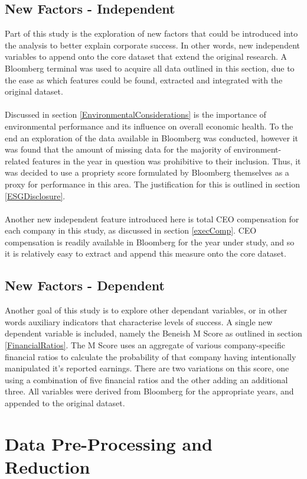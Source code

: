\subsection{New Factors - Independent}
{Part of this study is the exploration of new factors that could be introduced into the analysis to better explain corporate success. In other words, new independent variables to append onto the core dataset that extend the original research. A Bloomberg terminal was used to acquire all data outlined in this section, due to the ease as which features could be found, extracted and integrated with the original dataset.}\\\\
{Discussed in section \ref{EnvironmentalConsiderations} is the importance of environmental performance and its influence on overall economic health. To the end an exploration of the data available in Bloomberg was conducted, however it was found that the amount of missing data for the majority of environment-related features in the year in question was prohibitive to their inclusion. Thus, it was decided to use a propriety score formulated by Bloomberg themselves as a proxy for performance in this area. The justification for this is outlined in section \ref{ESGDisclosure}.}\\\\
{Another new independent feature introduced here is total CEO compensation for each company in this study, as discussed in section \ref{execComp}. CEO compensation is readily available in Bloomberg for the year under study, and so it is relatively easy to extract and append this measure onto the core dataset.}
\subsection{New Factors - Dependent}
{Another goal of this study is to explore other dependant variables, or in other words auxiliary indicators that characterise levels of success. A single new dependent variable is included, namely the Beneish M Score as outlined in section \ref{FinancialRatios}. The M Score uses an aggregate of various company-specific financial ratios to calculate the probability of that company having intentionally manipulated it's reported earnings. There are two variations on this score, one using a combination of five financial ratios and the other adding an additional three. All variables were derived from Bloomberg for the appropriate years, and appended to the original dataset.   
}
\section{Data Pre-Processing and Reduction}
